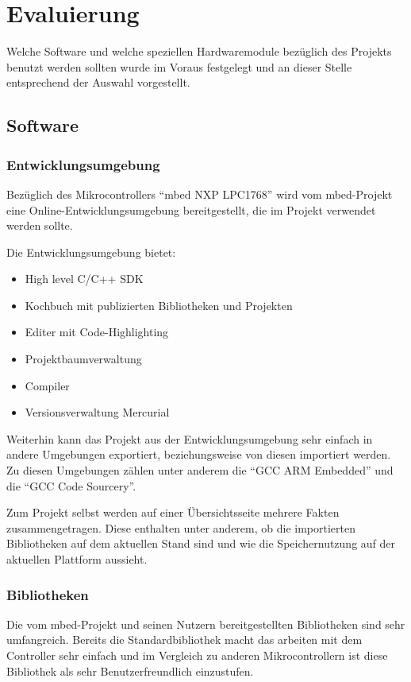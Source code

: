 \chapter{Evaluierung}
	Welche Software und welche speziellen Hardwaremodule bezüglich des Projekts benutzt werden sollten wurde im Voraus festgelegt und an dieser Stelle entsprechend der Auswahl vorgestellt.
	\section{Software}
		\subsection{Entwicklungsumgebung}
			Bezüglich des Mikrocontrollers \enquote{mbed NXP LPC1768} wird vom mbed-Projekt eine Online-Entwicklungsumgebung bereitgestellt, die im Projekt verwendet werden sollte.
			
			Die Entwicklungsumgebung bietet:
			
			\begin{itemize}
				\item High level C/C++ SDK
				\item Kochbuch mit publizierten Bibliotheken und Projekten
				\item Editer mit Code-Highlighting
				\item Projektbaumverwaltung
				\item Compiler
				\item Versionsverwaltung Mercurial
			\end{itemize}
			
			Weiterhin kann das Projekt aus der Entwicklungsumgebung sehr einfach in andere Umgebungen exportiert, beziehungsweise von diesen importiert werden. Zu diesen Umgebungen zählen unter anderem die \enquote{GCC ARM Embedded} und die \enquote{GCC Code Sourcery}.
			
			Zum Projekt selbst werden auf einer Übersichtsseite mehrere Fakten zusammengetragen. Diese enthalten unter anderem, ob die importierten Bibliotheken auf dem aktuellen Stand sind und wie die Speichernutzung auf der aktuellen Plattform aussieht.
		\subsection{Bibliotheken}
			Die vom mbed-Projekt und seinen Nutzern bereitgestellten Bibliotheken sind sehr umfangreich. Bereits die Standardbibliothek macht das arbeiten mit dem Controller sehr einfach und im Vergleich zu anderen Mikrocontrollern ist diese Bibliothek als sehr Benutzerfreundlich einzustufen.
			
